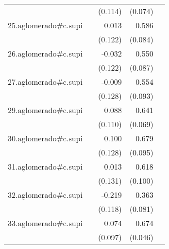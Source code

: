 {\begin{longtable}{l*{4}{D{.}{.}{-1}}}
            &                     &     (0.114)         &     (0.074)         &                     \\
\addlinespace
25.aglomerado#c.supi&                     &       0.013         &       0.586\sym{***}&                     \\
            &                     &     (0.122)         &     (0.084)         &                     \\
\addlinespace
26.aglomerado#c.supi&                     &      -0.032         &       0.550\sym{***}&                     \\
            &                     &     (0.122)         &     (0.087)         &                     \\
\addlinespace
27.aglomerado#c.supi&                     &      -0.009         &       0.554\sym{***}&                     \\
            &                     &     (0.128)         &     (0.093)         &                     \\
\addlinespace
29.aglomerado#c.supi&                     &       0.088         &       0.641\sym{***}&                     \\
            &                     &     (0.110)         &     (0.069)         &                     \\
\addlinespace
30.aglomerado#c.supi&                     &       0.100         &       0.679\sym{***}&                     \\
            &                     &     (0.128)         &     (0.095)         &                     \\
\addlinespace
31.aglomerado#c.supi&                     &       0.013         &       0.618\sym{***}&                     \\
            &                     &     (0.131)         &     (0.100)         &                     \\
\addlinespace
32.aglomerado#c.supi&                     &      -0.219         &       0.363\sym{***}&                     \\
            &                     &     (0.118)         &     (0.081)         &                     \\
\addlinespace
33.aglomerado#c.supi&                     &       0.074         &       0.674\sym{***}&                     \\
            &                     &     (0.097)         &     (0.046)         &                     \\

\end{longtable}}
